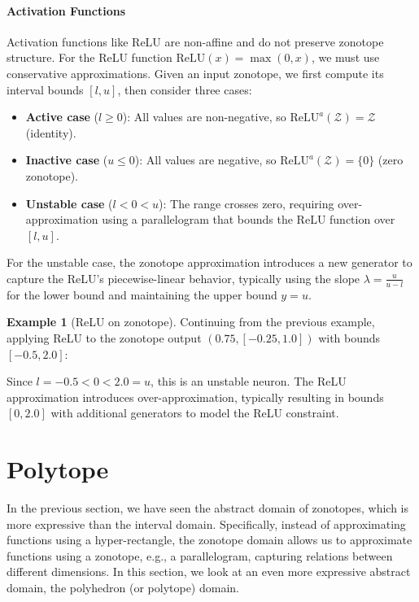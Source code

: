 \documentclass[oneside,11pt,dvipsnames]{book}
\numberwithin{equation}{section}
\theoremstyle{definition}
\newtheorem{example}{Example}[section]
\theoremstyle{remark}
\begin{document}
\paragraph{Activation Functions}

Activation functions like ReLU are non-affine and do not preserve zonotope structure. For the ReLU function \(\text{ReLU}(x) = \max(0, x)\), we must use conservative approximations. Given an input zonotope, we first compute its interval bounds \([l, u]\), then consider three cases:

\begin{itemize}
    \item \textbf{Active case} (\(l \geq 0\)): All values are non-negative, so \(\text{ReLU}^a(\mathcal{Z}) = \mathcal{Z}\) (identity).
    \item \textbf{Inactive case} (\(u \leq 0\)): All values are negative, so \(\text{ReLU}^a(\mathcal{Z}) = \{0\}\) (zero zonotope).
    \item \textbf{Unstable case} (\(l < 0 < u\)): The range crosses zero, requiring over-approximation using a parallelogram that bounds the ReLU function over \([l, u]\).
\end{itemize}

For the unstable case, the zonotope approximation introduces a new generator to capture the ReLU's piecewise-linear behavior, typically using the slope \(\lambda = \frac{u}{u-l}\) for the lower bound and maintaining the upper bound \(y = u\).

\begin{example}[ReLU on zonotope]
Continuing from the previous example, applying ReLU to the zonotope output \((0.75, [-0.25, 1.0])\) with bounds \([-0.5, 2.0]\):

Since \(l = -0.5 < 0 < 2.0 = u\), this is an unstable neuron. The ReLU approximation introduces over-approximation, typically resulting in bounds \([0, 2.0]\) with additional generators to model the ReLU constraint.
\end{example}



\section{Polytope}

In the previous section, we have seen the abstract domain of zonotopes, which is more expressive than the interval domain. Specifically, instead of approximating functions using a hyper-rectangle, the zonotope domain allows us to approximate functions using a zonotope, e.g., a parallelogram, capturing relations between different dimensions. In this section, we look at an even more expressive abstract domain, the polyhedron (or polytope) domain. 
\end{document}
